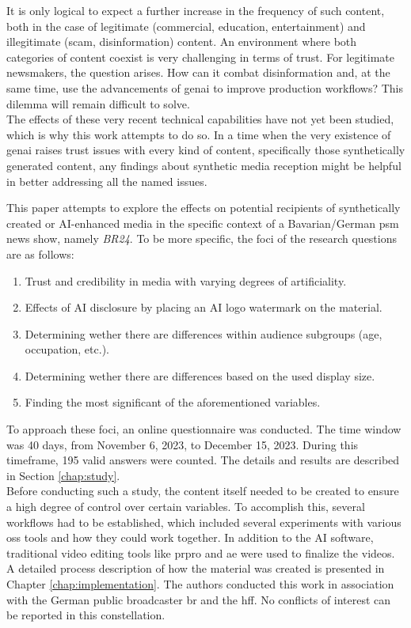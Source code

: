 \documentclass[
  a4paper,  %
  twoside,  %
  bibliography=totoc,
  headsepline,
  cleardoublepage=empty,
  parskip=half,
  draft=false
]{scrbook}
\begin{document}
It is only logical to expect a further increase in the frequency of such content, both in the case of legitimate (commercial, education, entertainment) and illegitimate (scam, disinformation) content. An environment where both categories of content coexist is very challenging in terms of trust. For legitimate newsmakers, the question arises. How can it combat disinformation and, at the same time, use the advancements of \gls{genai} to improve production workflows? This dilemma will remain difficult to solve. \\
The effects of these very recent technical capabilities have not yet been studied, which is why this work attempts to do so. In a time when the very existence of \gls{genai} raises trust issues with every kind of content, specifically those synthetically generated content, any findings about synthetic media reception might be helpful in better addressing all the named issues.

This paper attempts to explore the effects on potential recipients of synthetically created or AI-enhanced media in the specific context of a Bavarian/German \gls{psm} news show, namely \textit{BR24}. To be more specific, the foci of the research questions are as follows: 

\begin{enumerate}
  \item Trust and credibility in media with varying degrees of artificiality.
  \item Effects of AI disclosure by placing an AI logo watermark on the material.
  \item Determining wether there are differences within audience subgroups (age, occupation, etc.).
  \item Determining wether there are differences based on the used display size.
  \item Finding the most significant of the aforementioned variables.
\end{enumerate}

To approach these foci, an online questionnaire was conducted. The time window was 40 days, from November 6, 2023, to December 15, 2023. During this timeframe, 195 valid answers were counted. The details and results are described in Section \ref{chap:study}. \\
Before conducting such a study, the content itself needed to be created to ensure a high degree of control over certain variables. To accomplish this, several workflows had to be established, which included several experiments with various \gls{oss} tools and how they could work together. In addition to the AI software, traditional video editing tools like \gls{prpro} and \gls{ae} were used to finalize the videos. A detailed process description of how the material was created is presented in Chapter \ref{chap:implementation}. The authors conducted this work in association with the German public broadcaster \gls{br} and the \gls{hff}. No conflicts of interest can be reported in this constellation.
\end{document}
